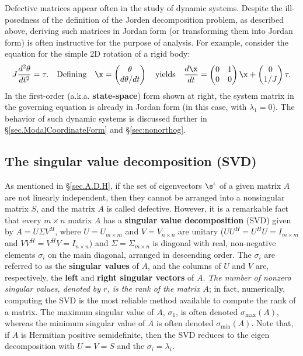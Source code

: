 Defective matrices appear often in the study of dynamic systems.  Despite the ill-posedness of the definition of the Jorden decomposition
problem, as described above, deriving such matrices in Jordan form (or transforming them
into Jordan form) is often instructive for the purpose of analysis.  For example, consider the equation for the simple 2D
rotation of a rigid body:
\begin{equation*}
   J \frac{d^2\theta}{dt^2}=\tau. \quad \textrm{Defining} \quad \x=\begin{pmatrix} \theta \\ d\theta/dt \end{pmatrix} \quad \textrm{yields} \quad
   \frac{d\x}{dt} = \begin{pmatrix} 0 & 1 \\ 0 & 0 \end{pmatrix} \x + \begin{pmatrix} 0 \\ 1/J \end{pmatrix} \tau.
\end{equation*}
In the first-order (a.k.a. {\bf state-space}) form shown at right, the system matrix in the governing equation is already in Jordan form
(in this case, with $\lambda_1=0$).  The behavior of such dynamic systems is discussed further in \S \ref{sec.ModalCoordinateForm} and \S \ref{sec:nonorthog}.

\clearpage
\subsection{The singular value decomposition (SVD)}\label{sec.A.D.G}

As mentioned in \S \ref{sec.A.D.H}, if the set of eigenvectors $\s^{\iota}$ of a given matrix $A$ are
not linearly independent, then they cannot be arranged into a
nonsingular matrix $S$, and the matrix $A$ is called defective.
However, it is a remarkable fact that every $m \times n$ matrix $A$
has a {\bf singular value decomposition} (SVD) given by $A=U \Sigma
V^H$, where $U=U_{m\times m}$ and $V=V_{n\times n}$ are unitary 
($U U^H =U^H U=I_{m\times m}$ and $V V^H =V^H V=I_{n\times n}$)
and $\Sigma=\Sigma_{m\times n}$ is diagonal with real, non-negative
elements $\sigma_{i}$ on the main diagonal, arranged in descending
order.  The $\sigma_{i}$ are referred to as the {\bf singular values}
of $A$, and the %
columns of $U$ and $V$ are, respectively, the {\bf left} and {\bf
right singular vectors} of $A$.  {\it The number of nonzero singular
values, denoted by $r$, is the rank of the matrix $A$}; in fact,
numerically, computing the SVD is the most reliable method available
to compute the rank of a matrix.  The maximum singular value of $A$, $\sigma_1$, is often denoted $\sigma_{\textrm{max}}(A)$,
whereas the minimum singular value of $A$ is often denoted $\sigma_{\textrm{min}}(A)$.
Note that, if $A$ is Hermitian positive
semidefinite, then the SVD reduces to the eigen decomposition
with $U=V=S$ and the $\sigma_{i}=\lambda_{i}$.


